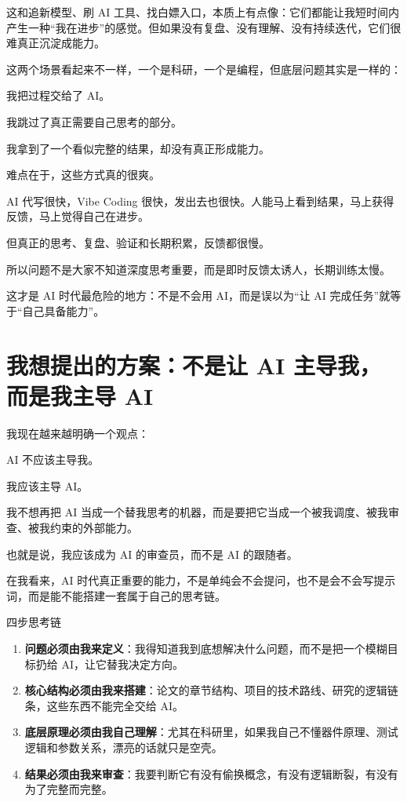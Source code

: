 \documentclass[UTF8,zihao=-4,a4paper]{ctexart}
\newcommand{\keyword}[1]{\textcolor{PrimaryDark}{\bfseries #1}}
\begin{document}
这和追新模型、刷 AI 工具、找白嫖入口，本质上有点像：它们都能让我短时间内产生一种“我在进步”的感觉。但如果没有复盘、没有理解、没有持续迭代，它们很难真正沉淀成能力。

这两个场景看起来不一样，一个是科研，一个是编程，但底层问题其实是一样的：

\begin{leadbox}
我把过程交给了 AI。\par
我跳过了真正需要自己思考的部分。\par
我拿到了一个看似完整的结果，却没有真正形成能力。
\end{leadbox}

难点在于，这些方式真的很爽。

AI 代写很快，Vibe Coding 很快，发出去也很快。人能马上看到结果，马上获得反馈，马上觉得自己在进步。

但真正的思考、复盘、验证和长期积累，反馈都很慢。

所以问题不是大家不知道深度思考重要，而是即时反馈太诱人，长期训练太慢。

这才是 AI 时代最危险的地方：不是不会用 AI，而是误以为“让 AI 完成任务”就等于“自己具备能力”。

\section{我想提出的方案：不是让 AI 主导我，而是我主导 AI}
我现在越来越明确一个观点：

\begin{leadbox}
AI 不应该主导我。\par
我应该主导 AI。
\end{leadbox}

我不想再把 AI 当成一个替我思考的机器，而是要把它当成一个被我调度、被我审查、被我约束的外部能力。

也就是说，我应该成为 AI 的审查员，而不是 AI 的跟随者。

在我看来，AI 时代真正重要的能力，不是单纯会不会提问，也不是会不会写提示词，而是能不能搭建一套属于自己的思考链。

\begin{notebox}{四步思考链}
\begin{enumerate}
  \item \keyword{问题必须由我来定义}：我得知道我到底想解决什么问题，而不是把一个模糊目标扔给 AI，让它替我决定方向。
  \item \keyword{核心结构必须由我来搭建}：论文的章节结构、项目的技术路线、研究的逻辑链条，这些东西不能完全交给 AI。
  \item \keyword{底层原理必须由我自己理解}：尤其在科研里，如果我自己不懂器件原理、测试逻辑和参数关系，漂亮的话就只是空壳。
  \item \keyword{结果必须由我来审查}：我要判断它有没有偷换概念，有没有逻辑断裂，有没有为了完整而完整。
\end{enumerate}
\end{notebox}
\end{document}
